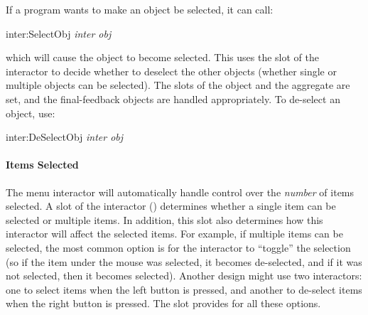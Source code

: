 If a program wants to make an object be selected, it can call:
\begin{programexample}
inter:SelectObj {\it inter obj}\value{function}
\end{programexample}
which will cause the object to become selected.  This uses the
 slot of the interactor to decide whether to deselect the
other objects (whether single or multiple objects can be selected).  The
 slots of the object and the aggregate are set, and the
final-feedback objects are handled appropriately.  To de-select an object, use:
\begin{programexample}
inter:DeSelectObj {\it inter obj}\value{function}
\end{programexample}


\paragraph{Items Selected}
\label{menuhowset}

The menu interactor will automatically handle control over the {\it number}
of items selected.  A slot of the interactor () determines
whether a single item can be selected or multiple items.  In addition, this
slot also determines how this interactor will affect the selected items.
For example, if multiple items can be selected, the most common option is
for the interactor to ``toggle'' the selection (so if the item under the
mouse was selected, it becomes de-selected, and if it was not selected,
then it becomes selected).  Another design might use two interactors: one
to select items when the left button is pressed, and another to de-select items
when the right button is pressed.  The  slot provides for all
these options.

